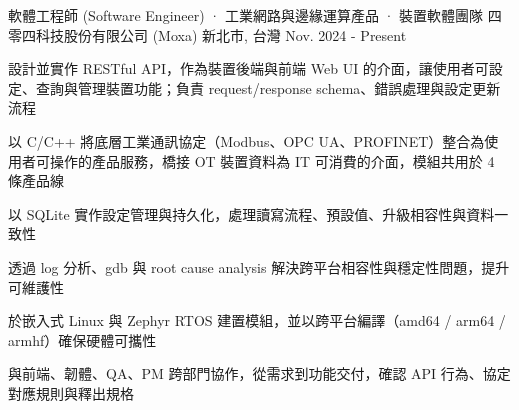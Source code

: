 

\begin{cventries}

  \cventry
    {軟體工程師 (Software Engineer) · 工業網路與邊緣運算產品 · 裝置軟體團隊} %
    {四零四科技股份有限公司 (Moxa)} %
    {新北市, 台灣} %
    {Nov. 2024 - Present} %
    {
      \begin{cvitems} %
        \item {設計並實作 RESTful API，作為裝置後端與前端 Web UI 的介面，讓使用者可設定、查詢與管理裝置功能；負責 request/response schema、錯誤處理與設定更新流程}
        \item {以 C/C++ 將底層工業通訊協定（Modbus、OPC UA、PROFINET）整合為使用者可操作的產品服務，橋接 OT 裝置資料為 IT 可消費的介面，模組共用於 4 條產品線}
        \item {以 SQLite 實作設定管理與持久化，處理讀寫流程、預設值、升級相容性與資料一致性}
        \item {透過 log 分析、gdb 與 root cause analysis 解決跨平台相容性與穩定性問題，提升可維護性}
        \item {於嵌入式 Linux 與 Zephyr RTOS 建置模組，並以跨平台編譯（amd64 / arm64 / armhf）確保硬體可攜性}
        \item {與前端、韌體、QA、PM 跨部門協作，從需求到功能交付，確認 API 行為、協定對應規則與釋出規格}
      \end{cvitems}
    }

\end{cventries}
